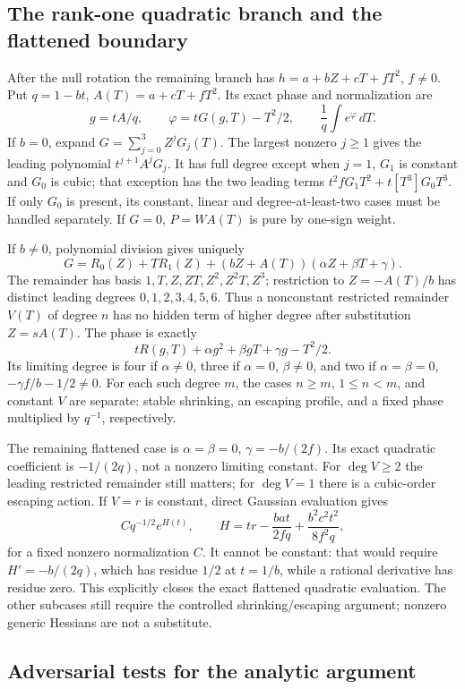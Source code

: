 \subsection{The rank-one quadratic branch and the flattened boundary}

After the null rotation the remaining branch has
$h=a+bZ+cT+fT^2$, $f\ne0$. Put $q=1-bt$, $A(T)=a+cT+fT^2$.
Its exact phase and normalization are
\[
 g=tA/q,\qquad \varphi=tG(g,T)-T^2/2,\qquad
 \frac1q\int e^\varphi\,dT.
\]
If $b=0$, expand $G=\sum_{j=0}^3Z^jG_j(T)$.
The largest nonzero $j\geq1$ gives the leading polynomial
$t^{j+1}A^jG_j$. It has full degree except when $j=1$,
$G_1$ is constant and $G_0$ is cubic; that exception has the two
leading terms $t^2fG_1T^2+t[T^3]G_0T^3$. If only $G_0$ is
present, its constant, linear and degree-at-least-two cases must be
handled separately. If $G=0$, $P=WA(T)$ is pure by one-sign weight.

If $b\ne0$, polynomial division gives uniquely
\[
 G=R_0(Z)+TR_1(Z)+(bZ+A(T))(\alpha Z+\beta T+\gamma).
\]
The remainder has basis $1,T,Z,ZT,Z^2,Z^2T,Z^3$; restriction to
$Z=-A(T)/b$ has distinct leading degrees $0,1,2,3,4,5,6$.
Thus a nonconstant restricted remainder $V(T)$ of degree $n$ has
no hidden term of higher degree after substitution $Z=sA(T)$.
The phase is exactly
\[
 tR(g,T)+\alpha g^2+\beta gT+\gamma g-T^2/2.
\]
Its limiting degree is four if $\alpha\ne0$, three if
$\alpha=0$, $\beta\ne0$, and two if
$\alpha=\beta=0$, $-\gamma f/b-1/2\ne0$.
For each such degree $m$, the cases $n\geq m$, $1\leq n<m$,
and constant $V$ are separate: stable shrinking, an escaping profile,
and a fixed phase multiplied by $q^{-1}$, respectively.

The remaining flattened case is
$\alpha=\beta=0$, $\gamma=-b/(2f)$. Its exact quadratic
coefficient is $-1/(2q)$, not a nonzero limiting constant.
For $\deg V\geq2$ the leading restricted remainder still matters;
for $\deg V=1$ there is a cubic-order escaping action.
If $V=r$ is constant, direct Gaussian evaluation gives
\[
 Cq^{-1/2}e^{H(t)},\qquad
 H=tr-\frac{bat}{2fq}+\frac{b^2c^2t^2}{8f^2q},
\]
for a fixed nonzero normalization $C$. It cannot be constant:
that would require $H'=-b/(2q)$, which has residue $1/2$ at
$t=1/b$, while a rational derivative has residue zero.
This explicitly closes the exact flattened quadratic evaluation.
The other subcases still require the controlled shrinking/escaping
argument; nonzero generic Hessians are not a substitute.

\subsection{Adversarial tests for the analytic argument}

